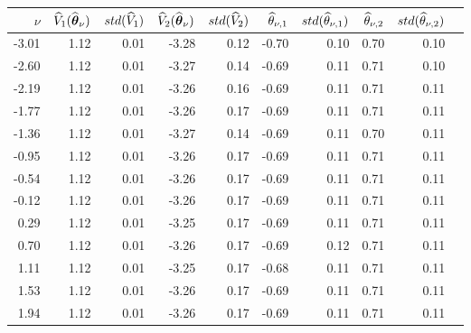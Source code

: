 \begin{tabular}{rrrrrrrrrr}\hline 
$\nu$  & $\widehat{V}_1(\widehat{\boldsymbol{\theta}}_{\nu})$ & $std(\widehat{V}_1)$ & $\widehat{V}_2(\widehat{\boldsymbol{\theta}}_{\nu})$ & $std(\widehat{V}_2)$ & $\widehat{\theta}_{\nu,1}$ & $std(\widehat{\theta}_{\nu,1})$ & $\widehat{\theta}_{\nu,2}$ & $std(\widehat{\theta}_{\nu,2})$ \\ \hline 
-3.01 &     1.12 &     0.01  &    -3.28 &      0.12 &     -0.70 &      0.10 &      0.70 &      0.10 \\ 
-2.60 &     1.12 &     0.01  &    -3.27 &      0.14 &     -0.69 &      0.11 &      0.71 &      0.10 \\ 
-2.19 &     1.12 &     0.01  &    -3.26 &      0.16 &     -0.69 &      0.11 &      0.71 &      0.11 \\ 
-1.77 &     1.12 &     0.01  &    -3.26 &      0.17 &     -0.69 &      0.11 &      0.71 &      0.11 \\ 
-1.36 &     1.12 &     0.01  &    -3.27 &      0.14 &     -0.69 &      0.11 &      0.70 &      0.11 \\ 
-0.95 &     1.12 &     0.01  &    -3.26 &      0.17 &     -0.69 &      0.11 &      0.71 &      0.11 \\ 
-0.54 &     1.12 &     0.01  &    -3.26 &      0.17 &     -0.69 &      0.11 &      0.71 &      0.11 \\ 
-0.12 &     1.12 &     0.01  &    -3.26 &      0.17 &     -0.69 &      0.11 &      0.71 &      0.11 \\ 
 0.29 &     1.12 &     0.01  &    -3.25 &      0.17 &     -0.69 &      0.11 &      0.71 &      0.11 \\ 
 0.70 &     1.12 &     0.01  &    -3.26 &      0.17 &     -0.69 &      0.12 &      0.71 &      0.11 \\ 
 1.11 &     1.12 &     0.01  &    -3.25 &      0.17 &     -0.68 &      0.11 &      0.71 &      0.11 \\ 
 1.53 &     1.12 &     0.01  &    -3.26 &      0.17 &     -0.69 &      0.11 &      0.71 &      0.11 \\ 
 1.94 &     1.12 &     0.01  &    -3.26 &      0.17 &     -0.69 &      0.11 &      0.71 &      0.11 \\ 

\end{tabular}
